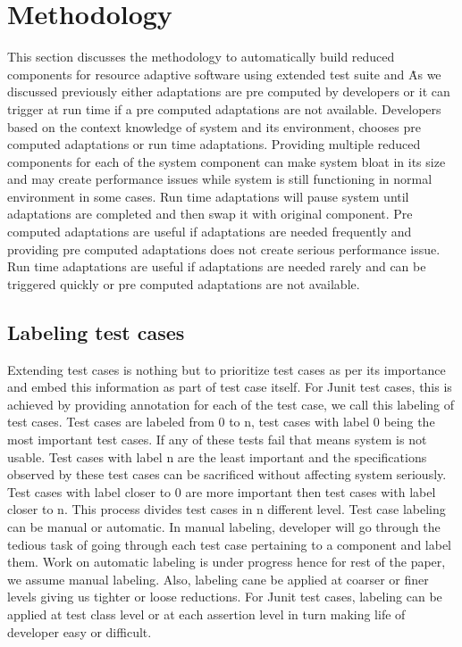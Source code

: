 \section{Methodology}

This section discusses the methodology to automatically build reduced components for resource adaptive software using extended test suite and \mytool\. As we discussed previously either adaptations are pre computed by developers or it can trigger at run time if a pre computed adaptations are not available.
Developers based on the context knowledge of system and its environment, chooses pre computed adaptations or run time adaptations. Providing multiple reduced components for each of the system component can make system bloat in its size and may create performance issues while system is still functioning in normal environment in some cases. Run time adaptations will pause system until adaptations are completed and then swap it with original component. Pre computed adaptations are useful if adaptations are needed frequently and providing pre computed adaptations does not create serious performance issue. Run time adaptations are useful if adaptations are needed rarely and can be triggered quickly or pre computed adaptations are not available.   

\subsection{Labeling test cases}

Extending test cases is nothing but to prioritize test cases as per its importance and embed this information as part of test case itself. For Junit test cases, this is achieved by providing annotation for each of the test case, we call this labeling of test cases. Test cases are labeled from 0 to n, test cases with label 0 being the most important test cases. If any of these tests fail that means system is not usable. Test cases with label n are the least important and the specifications observed by these test cases can be sacrificed without affecting system seriously. Test cases with label closer to 0 are more important then test cases with label closer to n. This process divides test cases in n different level. Test case labeling can be manual or automatic. In manual labeling, developer will go through the tedious task of going through each test case pertaining to a component and label them. Work on automatic labeling is under progress hence for rest of the paper, we assume manual labeling. Also, labeling cane be applied at coarser or finer levels giving us tighter or loose reductions. For Junit test cases, labeling can be applied at test class level or at each assertion level in turn making life of developer easy or difficult. 


